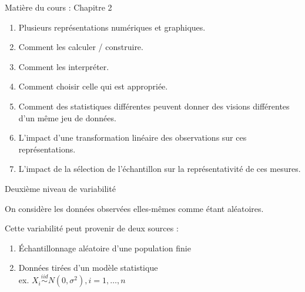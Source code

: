 \documentclass{BeamerTemplate}
\begin{document}
\begin{frame}{Matière du cours : Chapitre 2}



\begin{enumerate}
\item Plusieurs représentations numériques et graphiques. 
\item Comment les calculer / construire.
\item Comment les interpréter. 
\item Comment choisir celle qui est appropriée. 
\item Comment des statistiques différentes peuvent donner des visions différentes d'un même jeu de données.
\item L'impact d'une transformation linéaire des observations sur ces représentations.
\item L'impact de la sélection de l'échantillon sur la représentativité de ces mesures. 
\end{enumerate}


\end{frame}



\begin{frame}{Deuxième niveau de variabilité}

\begin{center}
{ \Large \alert{On considère les données observées elles-mêmes comme étant aléatoires. }}
\end{center}

\pause
\vspace{0.2in}
Cette variabilité peut provenir de deux sources :
\begin{enumerate}
\item Échantillonnage aléatoire d'une population finie
\item Données tirées d'un modèle statistique  \\
ex. $X_i \overset{iid}{\sim} N(0,\sigma^2), i = 1,\ldots, n$
\end{enumerate} 



\end{frame}
\end{document}
